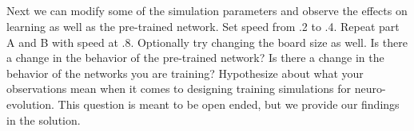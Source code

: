 \documentclass[12]{extarticle}
\begin{document}
\subsection{}
Next we can modify some of the simulation parameters and observe the effects on learning as well as the pre-trained network. Set speed from .2 to .4. Repeat part A and B with speed at .8. Optionally try changing the board size as well. Is there a change in the behavior of the pre-trained network? Is there a change in the behavior of the networks you are training? Hypothesize about what your observations mean when it comes to designing training simulations for neuro-evolution. This question is meant to be open ended, but we provide our findings in the solution. 

  


{}

\end{document}
